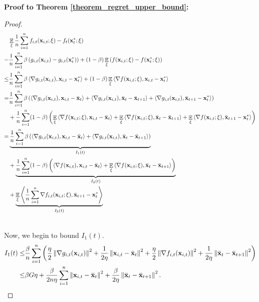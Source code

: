 \documentclass{article}
\begin{document}
\textbf{Proof to Theorem \ref{theorem_regret_upper_bound}:}
\begin{proof}
\begin{align}
\nonumber
& \mathop{\mathbb{E}}_{\xi} \frac{1}{n}\sum_{i=1}^n f_{i,t}({\bf x}_{i,t};\xi) - f_t({\bf x}_t^\ast;\xi) \\ \nonumber
=& \frac{1}{n}\sum_{i=1}^n \beta \left( g_{i,t}({\bf x}_{i,t}) - g_{i,t}({\bf x}_t^\ast) \right) + (1-\beta) \mathop{\mathbb{E}}_{\xi} \left( f({\bf x}_{i,t};\xi) - f({\bf x}_t^\ast;\xi) \right) \\ \nonumber
\le & \frac{1}{n}\sum_{i=1}^n \beta \left\langle\nabla g_{i,t}({\bf x}_{i,t}), {\bf x}_{i,t} - {\bf x}_t^\ast  \right\rangle + (1-\beta) \mathop{\mathbb{E}}_{\xi} \left\langle\nabla f({\bf x}_{i,t};\xi), {\bf x}_{i,t} - {\bf x}_t^\ast  \right\rangle \\ \nonumber
 = & \frac{1}{n}\sum_{i=1}^n \beta \left( \left\langle\nabla g_{i,t}({\bf x}_{i,t}), {\bf x}_{i,t} - \bar{{\bf x}}_t  \right\rangle + \left\langle\nabla g_{i,t}({\bf x}_{i,t}), \bar{{\bf x}}_t - \bar{{\bf x}}_{t+1} \right\rangle + \left\langle\nabla g_{i,t}({\bf x}_{i,t}), \bar{{\bf x}}_{t+1} - {\bf x}_t^\ast   \right\rangle  \right) \\ \nonumber 
 & + \frac{1}{n}\sum_{i=1}^n (1-\beta) \left(  \mathop{\mathbb{E}}_{\xi} \left\langle\nabla f({\bf x}_{i,t};\xi), {\bf x}_{i,t} - \bar{{\bf x}}_t  \right\rangle +  \mathop{\mathbb{E}}_{\xi} \left\langle\nabla f({\bf x}_{i,t};\xi), \bar{{\bf x}}_t - \bar{{\bf x}}_{t+1}  \right\rangle + \mathop{\mathbb{E}}_{\xi} \left\langle\nabla f({\bf x}_{i,t};\xi), \bar{{\bf x}}_{t+1} - {\bf x}_t^\ast  \right\rangle  \right)\\ \nonumber
= & \underbrace{ \frac{1}{n}\sum_{i=1}^n \beta \left( \left\langle\nabla g_{i,t}({\bf x}_{i,t}), {\bf x}_{i,t} - \bar{{\bf x}}_t  \right\rangle + \left\langle\nabla g_{i,t}({\bf x}_{i,t}), \bar{{\bf x}}_t - \bar{{\bf x}}_{t+1}  \right\rangle  \right) }_{I_1(t)} \\ \nonumber 
 & + \underbrace{ \frac{1}{n}\sum_{i=1}^n (1-\beta) \left(  \left\langle\nabla f({\bf x}_{i,t}), {\bf x}_{i,t} - \bar{{\bf x}}_t  \right\rangle +  \mathop{\mathbb{E}}_{\xi} \left\langle\nabla f({\bf x}_{i,t};\xi), \bar{{\bf x}}_t - \bar{{\bf x}}_{t+1}  \right\rangle \right) }_{I_2(t)}\\ \nonumber 
&+ \underbrace{ \mathop{\mathbb{E}}_{\xi} \left\langle\frac{1}{n}\sum_{i=1}^n\nabla f_{i,t}({\bf x}_{i,t};\xi), \bar{{\bf x}}_{t+1} - {\bf x}_t^\ast  \right\rangle }_{I_3(t)}\\ \nonumber
\end{align}

Now, we begin to bound $I_1(t)$.
\begin{align}
\nonumber
I_1(t) \le & \frac{\beta}{n}\sum_{i=1}^n \left(  \frac{\eta}{2}\left\lVert\nabla g_{i,t}({\bf x}_{i,t})\right\rVert^2 + \frac{1}{2\eta}\left\lVert{\bf x}_{i,t} - \bar{{\bf x}}_t\right\rVert^2  + \frac{\eta}{2}\left\lVert\nabla f_{i,t}({\bf x}_{i,t})\right\rVert^2 + \frac{1}{2\eta}\left\lVert\bar{{\bf x}}_t - \bar{{\bf x}}_{t+1}\right\rVert^2  \right)\\ \nonumber
\le & \beta G \eta + \frac{\beta}{2n\eta }\sum_{i=1}^n \left\lVert{\bf x}_{i,t} - \bar{{\bf x}}_t\right\rVert^2 + \frac{\beta }{2\eta }\left\lVert\bar{{\bf x}}_t - \bar{{\bf x}}_{t+1}\right\rVert^2.
\end{align}


\end{proof}
\end{document}
